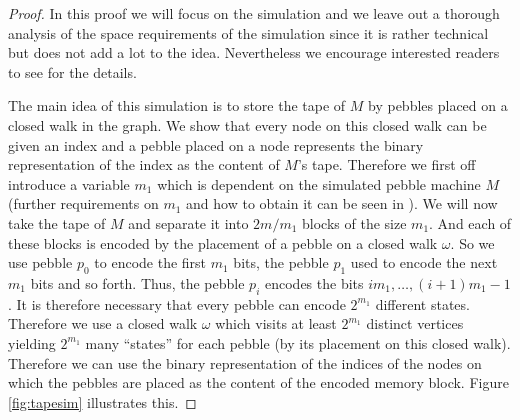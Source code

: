 \documentclass[draft,oneside]{scrartcl}
\begin{document}
\begin{proof}
  In this proof we will focus on the simulation and we leave out a thorough
  analysis of the space requirements of the simulation since it is rather
  technical but does not add a lot to the idea. Nevertheless we encourage
  interested readers to see \cite{pebbles} for the details.

  The main idea of this simulation is to store the tape of $M$ by pebbles
  placed on a closed walk in the graph. We show that every node on this closed
  walk can be given an index and a pebble placed on a node represents the
  binary representation of the index as the content of $M$'s tape. Therefore we
  first off introduce a variable $m_{1}$ which is dependent on the simulated
  pebble machine $M$ (further requirements on $m_{1}$ and how to obtain it
  can be seen in \cite{pebbles}). We will now take the tape of $M$ and separate
  it into $2m/m_{1}$ blocks of the size $m_{1}$. And each of these blocks is
  encoded by the placement of a pebble on a closed walk $\omega$. So we use
  pebble $p_{0}$ to encode the first $m_{1}$ bits, the pebble $p_{1}$ used to
  encode the next $m_{1}$ bits and so forth. Thus, the pebble $p_{i}$ encodes
  the bits $im_{1},\dots,(i+1)m_{1}-1$. It is therefore necessary that every
  pebble can encode $2^{m_1}$ different states. Therefore we use a closed walk
  $\omega$ which visits at least $2^{m_1}$ distinct vertices yielding $2^{m_1}$
  many \enquote{states} for each pebble (by its placement on this closed walk).
  Therefore we can use the binary representation of the indices of the nodes
  on which the pebbles are placed as the content of the encoded memory block.
  Figure \ref{fig:tapesim} illustrates this.


\end{proof}
\end{document}
